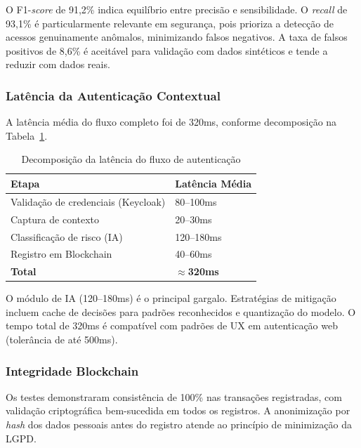 \documentclass[12pt]{article}
\begin{document}
O F1-\textit{score} de 91,2\% indica equilíbrio entre precisão e sensibilidade. O \textit{recall} de 93,1\% é particularmente relevante em segurança, pois prioriza a detecção de acessos genuinamente anômalos, minimizando falsos negativos. A taxa de falsos positivos de 8,6\% é aceitável para validação com dados sintéticos e tende a reduzir com dados reais.

\subsubsection{Latência da Autenticação Contextual}

A latência média do fluxo completo foi de 320ms, conforme decomposição na Tabela~\ref{tab:latency}.

\begin{table}[H]
\centering
\caption{Decomposição da latência do fluxo de autenticação}
\label{tab:latency}
\small
\begin{tabular}{@{}ll@{}}
\toprule
\textbf{Etapa} & \textbf{Latência Média} \\
\midrule
Validação de credenciais (Keycloak)      & 80--100ms \\
Captura de contexto                       & 20--30ms \\
Classificação de risco (IA)               & 120--180ms \\
Registro em Blockchain                    & 40--60ms \\
\midrule
\textbf{Total}                            & \textbf{$\approx$320ms} \\
\bottomrule
\end{tabular}
\end{table}

O módulo de IA (120--180ms) é o principal gargalo. Estratégias de mitigação incluem cache de decisões para padrões reconhecidos e quantização do modelo. O tempo total de 320ms é compatível com padrões de UX em autenticação web (tolerância de até 500ms).

\subsubsection{Integridade Blockchain}

Os testes demonstraram consistência de 100\% nas transações registradas, com validação criptográfica bem-sucedida em todos os registros. A anonimização por \textit{hash} dos dados pessoais antes do registro atende ao princípio de minimização da LGPD.
\end{document}
